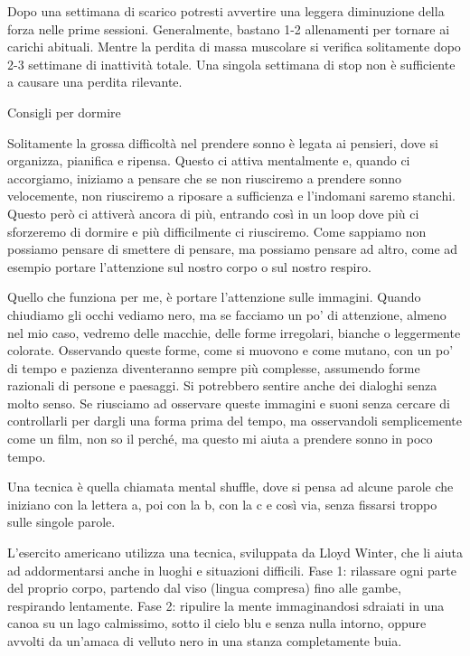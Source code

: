 \documentclass[12pt]{book} %
\begin{document}
Dopo una settimana di scarico potresti avvertire una leggera diminuzione della forza nelle prime sessioni. Generalmente, bastano 1-2 allenamenti per tornare ai carichi abituali. Mentre la perdita di massa muscolare si verifica solitamente dopo 2-3 settimane di inattività totale. Una singola settimana di stop non è sufficiente a causare una perdita rilevante.

\begin{mdframed}[linewidth=1pt]
Consigli per dormire

Solitamente la grossa difficoltà nel prendere sonno è legata ai pensieri, dove si organizza, pianifica e ripensa. Questo ci attiva mentalmente e,
quando ci accorgiamo, iniziamo a pensare che se non riusciremo a prendere sonno velocemente, non riusciremo a riposare a sufficienza e l'indomani saremo stanchi. Questo però ci attiverà ancora di più, entrando così in un loop dove più ci sforzeremo di dormire e più difficilmente ci riusciremo. Come sappiamo non possiamo pensare di smettere di pensare, ma possiamo pensare ad altro, come ad esempio portare l'attenzione sul nostro corpo o sul nostro respiro. 

Quello che funziona per me, è portare l'attenzione sulle immagini. Quando chiudiamo gli occhi vediamo nero, ma se facciamo un po' di attenzione, almeno nel mio caso, vedremo delle macchie, delle forme irregolari, bianche o leggermente colorate. Osservando queste forme, come si muovono e come mutano, con un po' di tempo e pazienza diventeranno sempre più complesse, assumendo forme razionali di persone e paesaggi. Si potrebbero sentire anche dei dialoghi senza molto senso. Se riusciamo ad osservare queste immagini e suoni senza cercare di controllarli per dargli una forma prima del tempo, ma osservandoli semplicemente come un film, non so il perché, ma questo mi aiuta a prendere sonno in poco tempo.

Una tecnica è quella chiamata mental shuffle, dove si pensa ad alcune parole che iniziano con la lettera a, poi con la b, con la c e così via, senza fissarsi troppo sulle singole parole.

L'esercito americano utilizza una tecnica, sviluppata da Lloyd Winter, che li aiuta ad addormentarsi anche in luoghi e situazioni difficili. Fase 1: rilassare ogni parte del proprio corpo, partendo dal viso (lingua compresa) fino alle gambe, respirando lentamente. Fase 2: ripulire la mente immaginandosi sdraiati in una canoa su un lago calmissimo, sotto il cielo blu e senza nulla intorno, oppure avvolti da un'amaca di velluto nero in una stanza completamente buia.


\end{mdframed}
\end{document}

